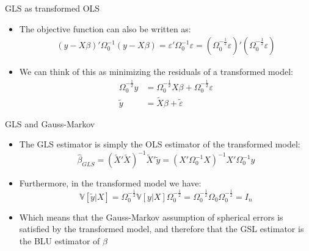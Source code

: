 \documentclass[fleqn, 10pt]{beamer}
\newcommand{\V}{\mathbb{V}}
\begin{document}
\begin{frame}{GLS as transformed OLS}
	
	\begin{itemize}
		\item The objective function can also be written as:
		\begin{align*}
		(y - X\beta)' \Omega_0^{-1} (y-X\beta) = \varepsilon' \Omega_0^{-1} \varepsilon = (\Omega_0^{-\frac{1}{2}}\varepsilon)' (\Omega_0^{-\frac{1}{2}}\varepsilon)
		\end{align*}
		\item We can think of this as minimizing the residuals of a transformed model:
		\begin{align*}
		\Omega_0^{-\frac{1}{2}} y &= \Omega_0^{-\frac{1}{2}} X \beta + \Omega_0^{-\frac{1}{2}} \varepsilon \\
		\tilde{y} &= \tilde{X} \beta + \tilde{\varepsilon}
		\end{align*}
	\end{itemize}
	
\end{frame}

\begin{frame}{GLS and Gauss-Markov}
	
	\begin{itemize}
		\item The GLS estimator is simply the OLS estimator of the transformed model:
		\[ \hat{\beta}_{GLS} = \left( \tilde{X}'\tilde{X} \right)^{-1} \tilde{X}' \tilde{y} = \left( X' \Omega_0^{-1} X \right)^{-1} X' \Omega_0^{-1} y \]
		\item Furthermore, in the transformed model we have:
		\[ \V[\tilde{y}|X] = \Omega_0^{-\frac{1}{2}} \V[y|X] \Omega_0^{-\frac{1}{2}} = \Omega_0^{-\frac{1}{2}} \Omega_0 \Omega_0^{-\frac{1}{2}} = I_n \]
		\item Which means that the Gauss-Markov assumption of spherical errors is satisfied by the transformed model, and therefore that the GSL estimator is the BLU estimator of \(\beta\)
	\end{itemize}
	
\end{frame}
\end{document}
